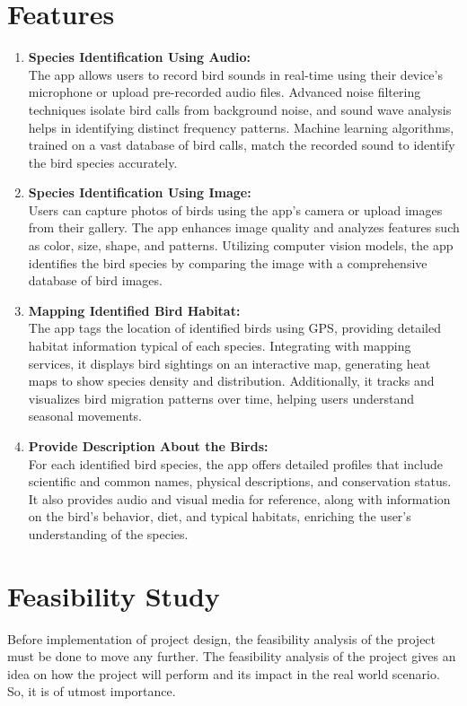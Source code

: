 \section{Features}
 \begin{enumerate}
    \item \textbf{Species Identification Using Audio:}\\
    The app allows users to record bird sounds in real-time using their device's microphone or 
    upload pre-recorded audio files. Advanced noise filtering techniques isolate bird calls from 
    background noise, and sound wave analysis helps in identifying distinct frequency patterns. 
    Machine learning algorithms, trained on a vast database of bird calls, match the recorded 
    sound to identify the bird species accurately.
    
    \item \textbf{Species Identification Using Image:}\\
    Users can capture photos of birds using the app's camera or upload images from their gallery.
    The app enhances image quality and analyzes features such as color, size, shape, and patterns. 
    Utilizing computer vision models, the app identifies the bird species by comparing the image 
    with a comprehensive database of bird images.
    
    \item \textbf{Mapping Identified Bird Habitat:}\\
    The app tags the location of identified birds using GPS, providing detailed habitat information 
    typical of each species. Integrating with mapping services, it displays bird sightings on an 
    interactive map, generating heat maps to show species density and distribution. Additionally, 
    it tracks and visualizes bird migration patterns over time, helping users understand seasonal
    movements.
    
    \item \textbf{Provide Description About the Birds:}\\
    For each identified bird species, the app offers detailed profiles that include scientific and 
    common names, physical descriptions, and conservation status. It also provides audio and visual 
    media for reference, along with information on the bird's behavior, diet, and typical habitats, 
    enriching the user's understanding of the species.
    
\end{enumerate}
 \section{Feasibility Study}
Before implementation of project design, the feasibility analysis of the project must be
done to move any further. The feasibility analysis of the project gives an idea on how the
project will perform and its impact in the real world scenario. So, it is of utmost
importance.
